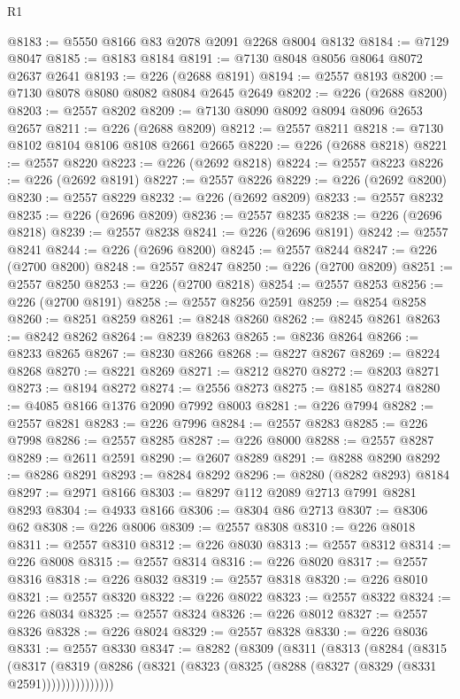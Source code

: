 \begin{lexlean}{R1}
\begin{coremodule}
@8183 := @5550 @8166 @83 @2078 @2091 @2268 @8004 @8132
@8184 := @7129 @8047
@8185 := @8183 @8184
@8191 := @7130 @8048 @8056 @8064 @8072 @2637 @2641
@8193 := @226 (@2688 @8191)
@8194 := @2557 @8193
@8200 := @7130 @8078 @8080 @8082 @8084 @2645 @2649
@8202 := @226 (@2688 @8200)
@8203 := @2557 @8202
@8209 := @7130 @8090 @8092 @8094 @8096 @2653 @2657
@8211 := @226 (@2688 @8209)
@8212 := @2557 @8211
@8218 := @7130 @8102 @8104 @8106 @8108 @2661 @2665
@8220 := @226 (@2688 @8218)
@8221 := @2557 @8220
@8223 := @226 (@2692 @8218)
@8224 := @2557 @8223
@8226 := @226 (@2692 @8191)
@8227 := @2557 @8226
@8229 := @226 (@2692 @8200)
@8230 := @2557 @8229
@8232 := @226 (@2692 @8209)
@8233 := @2557 @8232
@8235 := @226 (@2696 @8209)
@8236 := @2557 @8235
@8238 := @226 (@2696 @8218)
@8239 := @2557 @8238
@8241 := @226 (@2696 @8191)
@8242 := @2557 @8241
@8244 := @226 (@2696 @8200)
@8245 := @2557 @8244
@8247 := @226 (@2700 @8200)
@8248 := @2557 @8247
@8250 := @226 (@2700 @8209)
@8251 := @2557 @8250
@8253 := @226 (@2700 @8218)
@8254 := @2557 @8253
@8256 := @226 (@2700 @8191)
@8258 := @2557 @8256 @2591
@8259 := @8254 @8258
@8260 := @8251 @8259
@8261 := @8248 @8260
@8262 := @8245 @8261
@8263 := @8242 @8262
@8264 := @8239 @8263
@8265 := @8236 @8264
@8266 := @8233 @8265
@8267 := @8230 @8266
@8268 := @8227 @8267
@8269 := @8224 @8268
@8270 := @8221 @8269
@8271 := @8212 @8270
@8272 := @8203 @8271
@8273 := @8194 @8272
@8274 := @2556 @8273
@8275 := @8185 @8274
@8280 := @4085 @8166 @1376 @2090 @7992 @8003
@8281 := @226 @7994
@8282 := @2557 @8281
@8283 := @226 @7996
@8284 := @2557 @8283
@8285 := @226 @7998
@8286 := @2557 @8285
@8287 := @226 @8000
@8288 := @2557 @8287
@8289 := @2611 @2591
@8290 := @2607 @8289
@8291 := @8288 @8290
@8292 := @8286 @8291
@8293 := @8284 @8292
@8296 := @8280 (@8282 @8293) @8184
@8297 := @2971 @8166
@8303 := @8297 @112 @2089 @2713 @7991 @8281 @8293
@8304 := @4933 @8166
@8306 := @8304 @86 @2713
@8307 := @8306 @62
@8308 := @226 @8006
@8309 := @2557 @8308
@8310 := @226 @8018
@8311 := @2557 @8310
@8312 := @226 @8030
@8313 := @2557 @8312
@8314 := @226 @8008
@8315 := @2557 @8314
@8316 := @226 @8020
@8317 := @2557 @8316
@8318 := @226 @8032
@8319 := @2557 @8318
@8320 := @226 @8010
@8321 := @2557 @8320
@8322 := @226 @8022
@8323 := @2557 @8322
@8324 := @226 @8034
@8325 := @2557 @8324
@8326 := @226 @8012
@8327 := @2557 @8326
@8328 := @226 @8024
@8329 := @2557 @8328
@8330 := @226 @8036
@8331 := @2557 @8330
@8347 := @8282
    (@8309
      (@8311
        (@8313
          (@8284
            (@8315
              (@8317
                (@8319 (@8286 (@8321 (@8323 (@8325 (@8288 (@8327 (@8329 (@8331 @2591)))))))))))))))

\end{coremodule}
\end{lexlean}
